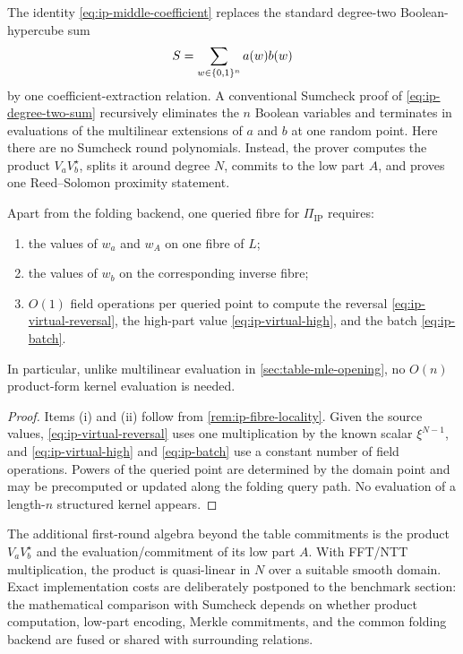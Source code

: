 The identity \eqref{eq:ip-middle-coefficient} replaces the standard degree-two Boolean-hypercube sum
\begin{equation}
  S=\sum_{w\in\{0,1\}^n}a(w)b(w)
  \label{eq:ip-degree-two-sum}
\end{equation}
by one coefficient-extraction relation.  A conventional Sumcheck proof of \eqref{eq:ip-degree-two-sum} recursively eliminates the $n$ Boolean variables and terminates in evaluations of the multilinear extensions of $a$ and $b$ at one random point.  Here there are no Sumcheck round polynomials.  Instead, the prover computes the product $V_aV_b^{\star}$, splits it around degree $N$, commits to the low part $A$, and proves one Reed--Solomon proximity statement.

\begin{proposition}
\label{prop:ip-local-verifier-work}
Apart from the folding backend, one queried fibre for $\Pi_{\mathrm{IP}}$ requires:
\begin{enumerate}[label=(\roman*),leftmargin=*]
  \item the values of $w_a$ and $w_A$ on one fibre of $L$;
  \item the values of $w_b$ on the corresponding inverse fibre;
  \item $O(1)$ field operations per queried point to compute the reversal \eqref{eq:ip-virtual-reversal}, the high-part value \eqref{eq:ip-virtual-high}, and the batch \eqref{eq:ip-batch}.
\end{enumerate}
In particular, unlike multilinear evaluation in \cref{sec:table-mle-opening}, no $O(n)$ product-form kernel evaluation is needed.
\end{proposition}

\begin{proof}
Items (i) and (ii) follow from \cref{rem:ip-fibre-locality}.  Given the source values, \eqref{eq:ip-virtual-reversal} uses one multiplication by the known scalar $\xi^{N-1}$, and \eqref{eq:ip-virtual-high} and \eqref{eq:ip-batch} use a constant number of field operations.  Powers of the queried point are determined by the domain point and may be precomputed or updated along the folding query path.  No evaluation of a length-$n$ structured kernel appears.
\end{proof}

\begin{remark}
\label{rem:ip-prover-arithmetic}
The additional first-round algebra beyond the table commitments is the product $V_aV_b^{\star}$ and the evaluation/commitment of its low part $A$.  With FFT/NTT multiplication, the product is quasi-linear in $N$ over a suitable smooth domain.  Exact implementation costs are deliberately postponed to the benchmark section: the mathematical comparison with Sumcheck depends on whether product computation, low-part encoding, Merkle commitments, and the common folding backend are fused or shared with surrounding relations.
\end{remark}

